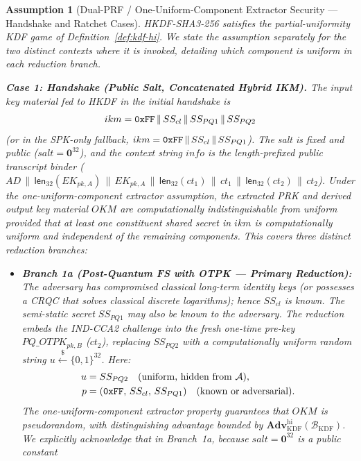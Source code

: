 \documentclass[11pt,a4paper]{article}
\theoremstyle{remark}
\theoremstyle{plain}
\newtheorem{assumption}[theorem]{Assumption}
\newcommand{\Adv}{\mathbf{Adv}}
\newcommand{\bits}{\{0,1\}}
\newcommand{\getsr}{\stackrel{\$}{\leftarrow}}
\newcommand{\flen}[1]{\mathsf{len}_{32}(#1)}
\newcommand{\hexlit}[1]{\text{\upshape\texttt{#1}}}
\begin{document}
\begin{assumption}[Dual-PRF / One-Uniform-Component Extractor Security — Handshake and Ratchet Cases]
\label{asm:kdf-hi}
HKDF-SHA3-256 satisfies the partial-uniformity KDF game of Definition~\ref{def:kdf-hi}.
We state the assumption separately for the two distinct contexts where it is invoked, detailing
which component is uniform in each reduction branch.

\medskip\noindent
\textbf{Case 1: Handshake (Public Salt, Concatenated Hybrid IKM).}
The input key material fed to HKDF in the initial handshake is
\[
  ikm = \hexlit{0xFF} \,\|\, SS_{cl} \,\|\, SS_{PQ1} \,\|\, SS_{PQ2}
\]
(or in the SPK-only fallback, $ikm = \hexlit{0xFF} \,\|\, SS_{cl} \,\|\, SS_{PQ1}$).
The salt is fixed and public ($salt = \mathbf{0}^{32}$), and the context string $info$ is the
length-prefixed public transcript binder ($AD \,\|\, \flen{EK_{pk,A}} \,\|\, EK_{pk,A} \,\|\, \flen{ct_1} \,\|\, ct_1 \,\|\, \flen{ct_2} \,\|\, ct_2$).
Under the one-uniform-component extractor assumption, the extracted PRK and derived output key material
$OKM$ are computationally indistinguishable from uniform provided that at least one constituent shared
secret in $ikm$ is computationally uniform and independent of the remaining components.
This covers three distinct reduction branches:
\begin{itemize}
  \item \textbf{Branch 1a (Post-Quantum FS with OTPK — Primary Reduction):}
        The adversary has compromised classical long-term identity keys (or possesses a CRQC that
        solves classical discrete logarithms); hence $SS_{cl}$ is known.  The semi-static secret
        $SS_{PQ1}$ may also be known to the adversary.  The reduction embeds the IND-CCA2 challenge
        into the fresh one-time pre-key $PQ\_OTPK_{pk,B}$ ($ct_2$), replacing $SS_{PQ2}$ with a
        computationally uniform random string $u \getsr \bits^{32}$.  Here:
        \begin{align*}
          u &= SS_{PQ2} \quad \text{(uniform, hidden from $\mathcal{A}$)}, \\
          p &= (\hexlit{0xFF},\, SS_{cl},\, SS_{PQ1}) \quad \text{(known or adversarial)}.
        \end{align*}
        The one-uniform-component extractor property guarantees that $OKM$ is pseudorandom, with
        distinguishing advantage bounded by $\Adv^{\mathrm{hi}}_{\mathrm{KDF}}(\mathcal{B}_{\mathrm{KDF}})$.
        We explicitly acknowledge that in Branch~1a, because $salt = \mathbf{0}^{32}$ is a public constant

\end{itemize}
\end{assumption}
\end{document}
